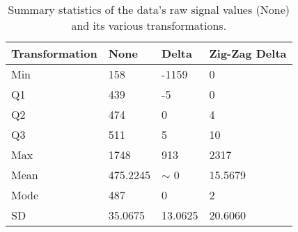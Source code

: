 \begin{table}
    \caption{\label{tab:trans} Summary statistics of the data's raw signal values (None) and its various transformations.}
    \begin{tabular}{|l|l|l|l|}
        \hline
Transformation & None & Delta & Zig-Zag Delta\\
        \hline
Min & 158& -1159& 0\\
	    Q1 & 439& -5& 0\\

Q2 & 474& 0& 4\\
	    Q3 & 511& 5& 10\\
Max & 1748& 913& 2317\\
\hline
Mean & 475.2245& $\sim$ 0& 15.5679\\
	    Mode & 487& 0& 2\\
SD & 35.0675& 13.0625& 20.6060\\
	\hline
    \end{tabular}
\end{table}
